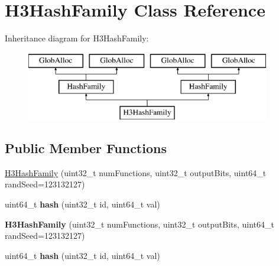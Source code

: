 \hypertarget{classH3HashFamily}{\section{H3\-Hash\-Family Class Reference}
\label{classH3HashFamily}
}
Inheritance diagram for H3\-Hash\-Family\-:\begin{figure}[H]
\begin{center}
\leavevmode
\includegraphics[height=3.000000cm]{classH3HashFamily}
\end{center}
\end{figure}
\subsection*{Public Member Functions}
\begin{DoxyCompactItemize}
\item 
\hyperlink{classH3HashFamily_a1702cad8d3646b91351f3e3ca34a73e9}{H3\-Hash\-Family} (uint32\-\_\-t num\-Functions, uint32\-\_\-t output\-Bits, uint64\-\_\-t rand\-Seed=123132127)
\item 
\hypertarget{classH3HashFamily_afc78fb6206e1065e3219db45249a625c}{uint64\-\_\-t {\bfseries hash} (uint32\-\_\-t id, uint64\-\_\-t val)}\label{classH3HashFamily_afc78fb6206e1065e3219db45249a625c}

\item 
\hypertarget{classH3HashFamily_a1702cad8d3646b91351f3e3ca34a73e9}{{\bfseries H3\-Hash\-Family} (uint32\-\_\-t num\-Functions, uint32\-\_\-t output\-Bits, uint64\-\_\-t rand\-Seed=123132127)}\label{classH3HashFamily_a1702cad8d3646b91351f3e3ca34a73e9}

\item 
\hypertarget{classH3HashFamily_afc78fb6206e1065e3219db45249a625c}{uint64\-\_\-t {\bfseries hash} (uint32\-\_\-t id, uint64\-\_\-t val)}\label{classH3HashFamily_afc78fb6206e1065e3219db45249a625c}

\end{DoxyCompactItemize}


